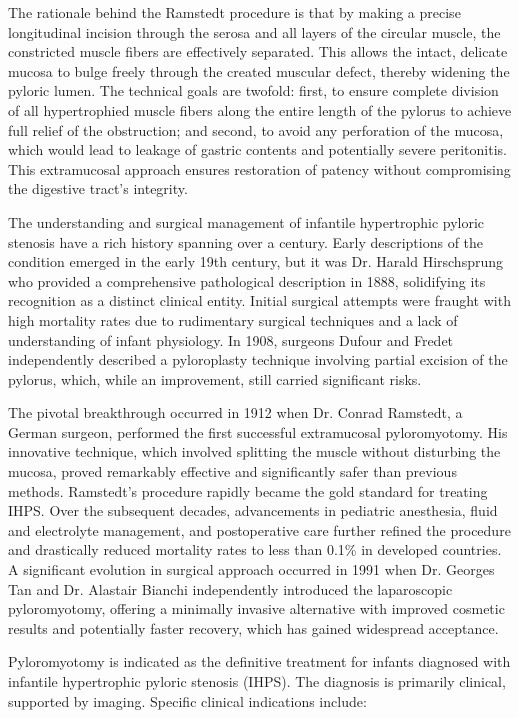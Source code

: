 The rationale behind the Ramstedt procedure is that by making a precise longitudinal incision through the serosa and all layers of the circular muscle, the constricted muscle fibers are effectively separated. This allows the intact, delicate mucosa to bulge freely through the created muscular defect, thereby widening the pyloric lumen. The technical goals are twofold: first, to ensure complete division of all hypertrophied muscle fibers along the entire length of the pylorus to achieve full relief of the obstruction; and second, to avoid any perforation of the mucosa, which would lead to leakage of gastric contents and potentially severe peritonitis. This extramucosal approach ensures restoration of patency without compromising the digestive tract's integrity.

The understanding and surgical management of infantile hypertrophic pyloric stenosis have a rich history spanning over a century. Early descriptions of the condition emerged in the early 19th century, but it was Dr. Harald Hirschsprung who provided a comprehensive pathological description in 1888, solidifying its recognition as a distinct clinical entity. Initial surgical attempts were fraught with high mortality rates due to rudimentary surgical techniques and a lack of understanding of infant physiology. In 1908, surgeons Dufour and Fredet independently described a pyloroplasty technique involving partial excision of the pylorus, which, while an improvement, still carried significant risks.

The pivotal breakthrough occurred in 1912 when Dr. Conrad Ramstedt, a German surgeon, performed the first successful extramucosal pyloromyotomy. His innovative technique, which involved splitting the muscle without disturbing the mucosa, proved remarkably effective and significantly safer than previous methods. Ramstedt's procedure rapidly became the gold standard for treating IHPS. Over the subsequent decades, advancements in pediatric anesthesia, fluid and electrolyte management, and postoperative care further refined the procedure and drastically reduced mortality rates to less than 0.1\% in developed countries. A significant evolution in surgical approach occurred in 1991 when Dr. Georges Tan and Dr. Alastair Bianchi independently introduced the laparoscopic pyloromyotomy, offering a minimally invasive alternative with improved cosmetic results and potentially faster recovery, which has gained widespread acceptance.

Pyloromyotomy is indicated as the definitive treatment for infants diagnosed with infantile hypertrophic pyloric stenosis (IHPS). The diagnosis is primarily clinical, supported by imaging. Specific clinical indications include:

